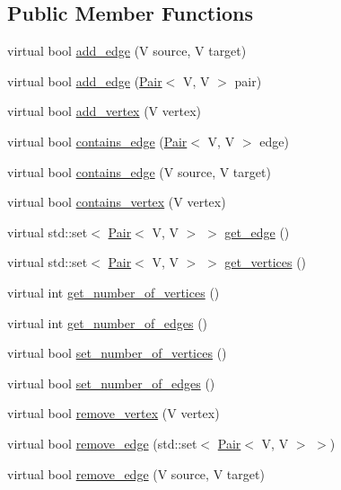 \subsection*{Public Member Functions}
\begin{DoxyCompactItemize}
\item 
virtual bool \hyperlink{classGraph_a5d4385108258013f08650b8416263491}{add\+\_\+edge} (V source, V target)
\item 
virtual bool \hyperlink{classGraph_a7f53ea4210373a0cc23387f8fd00c407}{add\+\_\+edge} (\hyperlink{classPair}{Pair}$<$ V, V $>$ pair)
\item 
virtual bool \hyperlink{classGraph_ab7b409e1f6b821729cc50f0b841839cf}{add\+\_\+vertex} (V vertex)
\item 
virtual bool \hyperlink{classGraph_a9b5abbf0609d6759178231fd4ad1b9cf}{contains\+\_\+edge} (\hyperlink{classPair}{Pair}$<$ V, V $>$ edge)
\item 
virtual bool \hyperlink{classGraph_a8351227a94797412842af04eb5da11f1}{contains\+\_\+edge} (V source, V target)
\item 
virtual bool \hyperlink{classGraph_a7e92c541821a0d5631f06a1bf8e952b2}{contains\+\_\+vertex} (V vertex)
\item 
virtual std\+::set$<$ \hyperlink{classPair}{Pair}$<$ V, V $>$ $>$ \hyperlink{classGraph_a847d814a578284a8077a48a3d3b0f489}{get\+\_\+edge} ()
\item 
virtual std\+::set$<$ \hyperlink{classPair}{Pair}$<$ V, V $>$ $>$ \hyperlink{classGraph_afc915b991e4c288153ef2bf0b78e1018}{get\+\_\+vertices} ()
\item 
virtual int \hyperlink{classGraph_a034497a7f3c868e808e21a1e19cf9f7b}{get\+\_\+number\+\_\+of\+\_\+vertices} ()
\item 
virtual int \hyperlink{classGraph_a9ea6293e51579980dd72efdf2886bb31}{get\+\_\+number\+\_\+of\+\_\+edges} ()
\item 
virtual bool \hyperlink{classGraph_ad64e650ed7165eca49da146bd2228387}{set\+\_\+number\+\_\+of\+\_\+vertices} ()
\item 
virtual bool \hyperlink{classGraph_a3b3b210ef234c3e3e9d272b79ff683bc}{set\+\_\+number\+\_\+of\+\_\+edges} ()
\item 
virtual bool \hyperlink{classGraph_a5454b3a09601a16178453724070edf5c}{remove\+\_\+vertex} (V vertex)
\item 
virtual bool \hyperlink{classGraph_a1b9b0e39be7b5da7f1e8ce8c5d52be8e}{remove\+\_\+edge} (std\+::set$<$ \hyperlink{classPair}{Pair}$<$ V, V $>$ $>$)
\item 
virtual bool \hyperlink{classGraph_aaea37d99e6b0202c7c6fe132e0e5a372}{remove\+\_\+edge} (V source, V target)
\end{DoxyCompactItemize}


